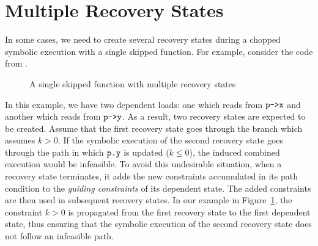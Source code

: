 
\section{Multiple Recovery States}
\label{Se:MultiRecovery}
In some cases, we need to create several recovery states during a
chopped symbolic execution with a single skipped function.
For example, consider the code from .

\begin{figure}
  \captionsetup[subfloat]{labelformat=empty}
  \subfloat[]{
    
  }
  \caption{A single skipped function with multiple recovery states}
  \label{fig:multiple-recovery-states}
\end{figure}

In this example, we have two dependent loads:
one which reads from $\texttt{p->x}$ and another which reads from $\texttt{p->y}$.
As a result, two recovery states are expected to be created.
Assume that the first recovery state goes through the branch which assumes $k > 0$.
If the symbolic execution of the second recovery state goes through the path in which
$\texttt{p.y}$ is updated ($k\le0$), the induced combined execution
would be infeasible. To avoid this undesirable situation, when a
recovery state terminates, it adds the new constraints accumulated in
its path condition to the \textit{guiding constraints} of its dependent state. The added
constraints are then used in subsequent recovery states. In our
example in Figure~\ref{fig:multiple-recovery-states}, the constraint $k > 0$ is
propagated from the first recovery state to the first dependent state,
thus ensuring that the symbolic execution of the second recovery state
does not follow an infeasible path.

